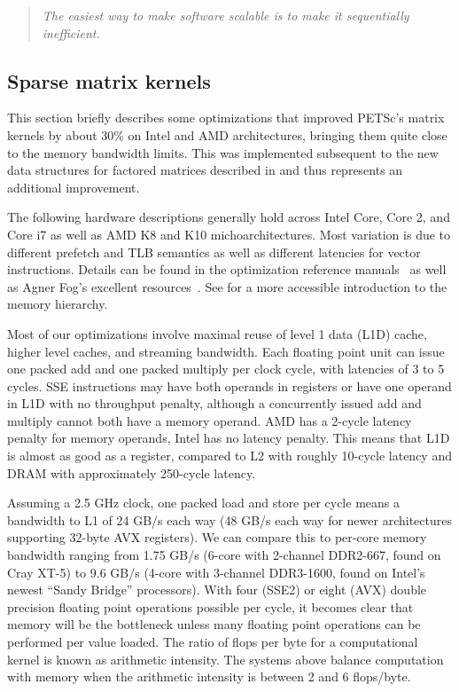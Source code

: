 \begin{quote}
  \emph{The easiest way to make software scalable is to make it sequentially inefficient.}~\cite{gropp1999exploiting}
\end{quote}

\subsection{Sparse matrix kernels}\label{ssec:sparsekernels}

This section briefly describes some optimizations that improved PETSc's matrix kernels by about 30\% on Intel and AMD architectures, bringing them quite close to the memory bandwidth limits.
This was implemented subsequent to the new data structures for factored matrices described in \cite{smith2010sparse} and thus represents an additional improvement.

The following hardware descriptions generally hold across Intel Core, Core 2, and Core i7 as well as AMD K8 and K10 michoarchitectures.
Most variation is due to different prefetch and TLB semantics as well as different latencies for vector instructions.
Details can be found in the optimization reference manuals~\cite{intel2011optimization,amd2009optimization} as well as Agner Fog's excellent resources~\cite{fog2011michoarchitecture,fog2011instruction}.
See \cite{drepper2007memory} for a more accessible introduction to the memory hierarchy.

Most of our optimizations involve maximal reuse of level 1 data (L1D) cache, higher level caches, and streaming bandwidth.
Each floating point unit can issue one packed add and one packed multiply per clock cycle, with latencies of 3 to 5 cycles.
SSE instructions may have both operands in registers or have one operand in L1D with no throughput penalty, although a concurrently issued add and multiply cannot both have a memory operand.
AMD has a 2-cycle latency penalty for memory operands, Intel has no latency penalty.
This means that L1D is almost as good as a register, compared to L2 with roughly 10-cycle latency and DRAM with approximately 250-cycle latency.

Assuming a 2.5 GHz clock, one packed load and store per cycle means a bandwidth to L1 of 24 GB/s each way (48 GB/s each way for newer architectures supporting 32-byte AVX registers).
We can compare this to per-core memory bandwidth ranging from 1.75 GB/s (6-core with 2-channel DDR2-667, found on Cray XT-5) to 9.6 GB/s (4-core with 3-channel DDR3-1600, found on Intel's newest ``Sandy Bridge'' processors).
With four (SSE2) or eight (AVX) double precision floating point operations possible per cycle, it becomes clear that memory will be the bottleneck unless many floating point operations can be performed per value loaded.
The ratio of flops per byte for a computational kernel is known as arithmetic intensity.
The systems above balance computation with memory when the arithmetic intensity is between 2 and 6 flops/byte.

